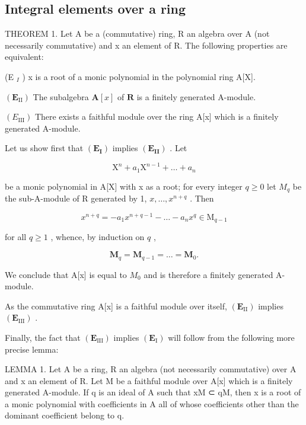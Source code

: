 \subsection{Integral elements over a ring}

THEOREM 1. Let A be a (commutative) ring, R an algebra over A (not necessarily commutative) and x an element of R. The following properties are equivalent:

(E \(_{I}\) ) x is a root of a monic polynomial in the polynomial ring A{[}X{]}.

\((\mathbf{E}_{\mathrm{II}})\) The subalgebra \(\mathbf{A}[x]\) of \(\mathbf{R}\) is a finitely generated A-module.

\((E_{\mathrm{III}})\) There exists a faithful module over the ring A{[}x{]} which is a finitely generated A-module.

Let us show first that \((\mathbf{E}_{\mathbf{I}})\) implies \((\mathbf{E}_{\mathbf{II}})\) . Let

\[
\mathrm{X} ^ {n} + a _ {1} \mathrm{X} ^ {n - 1} + \dots + a _ {n}
\]

be a monic polynomial in A{[}X{]} with x as a root; for every integer \(q \geqslant 0\) let \(M_{q}\) be the sub-A-module of R generated by 1, \(x, \ldots, x^{n+q}\) . Then

\[
x ^ {n + q} = - a _ {1} x ^ {n + q - 1} - \dots - a _ {n} x ^ {q} \in \mathrm{M} _ {q - 1}
\]

for all \(q \geqslant 1\) , whence, by induction on \(q\) ,

\[
\mathbf {M} _ {q} = \mathbf {M} _ {q - 1} = \dots = \mathbf {M} _ {0}.
\]

We conclude that A{[}x{]} is equal to \(M_{0}\) and is therefore a finitely generated A-module.

As the commutative ring A{[}x{]} is a faithful module over itself, \((\mathbf{E}_{\mathrm{II}})\) implies \((\mathbf{E}_{\mathrm{III}})\) .

Finally, the fact that \((\mathbf{E}_{\mathrm{III}})\) implies \((\mathbf{E}_{\mathrm{I}})\) will follow from the following more precise lemma:

LEMMA 1. Let A be a ring, R an algebra (not necessarily commutative) over A and x an element of R. Let M be a faithful module over A{[}x{]} which is a finitely generated A-module. If q is an ideal of A such that xM ⊂ qM, then x is a root of a monic polynomial with coefficients in A all of whose coefficients other than the dominant coefficient belong to q.

